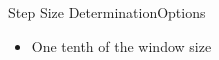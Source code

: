 \begin{frame}{Step Size Determination}{Options}
    \begin{itemize}
        \item One tenth of the window size
    \end{itemize}
\end{frame}
